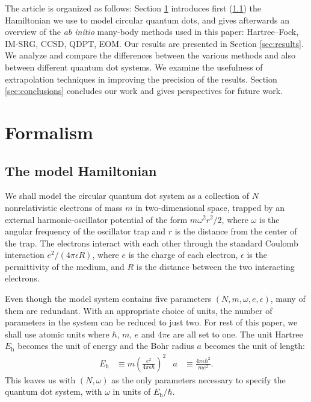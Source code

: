 The article is organized as follows: Section \ref{sec:formalism} introduces first (\ref{subsec:modelHamiltonian}) the Hamiltonian we use to model circular quantum dots, and gives afterwards an overview of the \textit{ab initio} many-body methods used in this paper: Hartree--Fock, IM-SRG, CCSD, QDPT, EOM.  Our results are presented in Section \ref{sec:results}.  We analyze and compare the differences between the various methods and also between different quantum dot systems.  We examine the usefulness of extrapolation techniques in improving the precision of the results.  Section \ref{sec:conclusions} concludes our work and gives perspectives for future work.

\section{Formalism}
\label{sec:formalism}

\subsection{The model Hamiltonian}
\label{subsec:modelHamiltonian}

We shall model the circular quantum dot system as a collection of $N$ nonrelativistic electrons of mass $m$ in two-dimensional space, trapped by an external harmonic-oscillator potential of the form $m \omega^2r^2 / 2$, where $\omega$ is the angular frequency of the oscillator trap and $r$ is the distance from the center of the trap.  The electrons interact with each other through the standard Coulomb interaction $e^2 / (4 \pi \epsilon R)$, where $e$ is the charge of each electron, $\epsilon$ is the permittivity of the medium, and $R$ is the distance between the two interacting electrons.

Even though the model system contains five parameters $(N, m, \omega, e, \epsilon)$, many of them are redundant.  With an appropriate choice of units, the number of parameters in the system can be reduced to just two.  For rest of this paper, we shall use atomic units where $\hbar$, $m$, $e$ and $4 \pi \epsilon$ are all set to one.  The unit Hartree $E_{\mathrm{h}}$ becomes the unit of energy and the Bohr radius $a$ becomes the unit of length:
\begin{align*}
  E_{\mathrm{h}} &\equiv m \left(\frac{e^2}{4 \pi \epsilon \hbar}\right)^2 &
  a &\equiv \frac{4 \pi \epsilon \hbar^2}{m e^2}.
\end{align*}
This leaves us with $(N, \omega)$ as the only parameters necessary to specify the quantum dot system, with $\omega$ in units of $E_{\mathrm{h}} / \hbar$.


